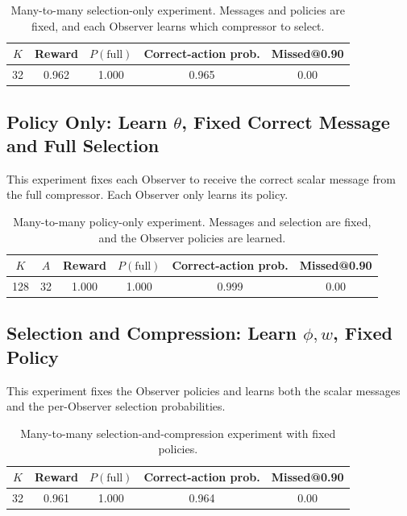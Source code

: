 \documentclass[11pt]{article}
\begin{document}
\begin{table}[H]
\centering
\small
\begin{tabular}{ccccc}
\toprule
\(K\) & Reward & \(P(\mathrm{full})\) & Correct-action prob. & Missed@0.90 \\
\midrule
32 & 0.962 & 1.000 & 0.965 & 0.00 \\
\bottomrule
\end{tabular}
\caption{Many-to-many selection-only experiment. Messages and policies are
fixed, and each Observer learns which compressor to select.}
\label{tab:many-to-many-w-only}
\end{table}

\subsection{Policy Only: Learn \(\theta\), Fixed Correct Message and Full Selection}

This experiment fixes each Observer to receive the correct scalar message from
the full compressor. Each Observer only learns its policy.

\begin{table}[H]
\centering
\small
\begin{tabular}{cccccc}
\toprule
\(K\) & \(A\) & Reward & \(P(\mathrm{full})\) & Correct-action prob. & Missed@0.90 \\
\midrule
128 & 32 & 1.000 & 1.000 & 0.999 & 0.00 \\
\bottomrule
\end{tabular}
\caption{Many-to-many policy-only experiment. Messages and selection are fixed,
and the Observer policies are learned.}
\label{tab:many-to-many-theta-only}
\end{table}

\subsection{Selection and Compression: Learn \(\phi,w\), Fixed Policy}

This experiment fixes the Observer policies and learns both the scalar messages
and the per-Observer selection probabilities.

\begin{table}[H]
\centering
\small
\begin{tabular}{ccccc}
\toprule
\(K\) & Reward & \(P(\mathrm{full})\) & Correct-action prob. & Missed@0.90 \\
\midrule
32 & 0.961 & 1.000 & 0.964 & 0.00 \\
\bottomrule
\end{tabular}
\caption{Many-to-many selection-and-compression experiment with fixed policies.}
\label{tab:many-to-many-phi-w}
\end{table}
\end{document}

